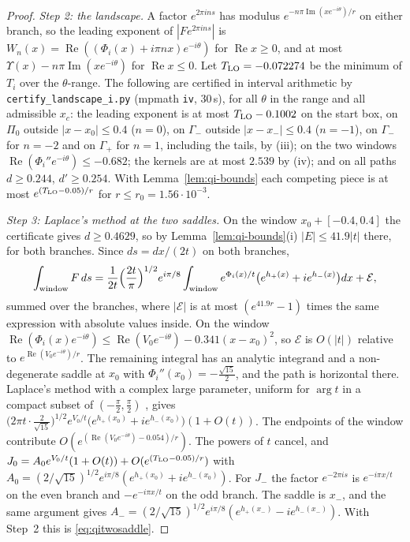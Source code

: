 \documentclass[11pt]{article}
\theoremstyle{plain}
\theoremstyle{definition}
\theoremstyle{remark}
\theoremstyle{plain}\newtheorem*{maintheorem}{Main Theorem}
\begin{document}
\begin{proof}
\emph{Step 2: the landscape.} A factor $e^{2\pi ins}$ has modulus $e^{-n\pi\operatorname{Im}(xe^{-i\theta})/r}$ on
either branch, so the leading exponent of $|Fe^{2\pi ins}|$ is
$W_n(x)=\operatorname{Re}((\Phi_i(x)+i\pi nx)e^{-i\theta})$ for $\operatorname{Re}x\ge0$, and at most
$\Upsilon(x)-n\pi\operatorname{Im}(xe^{-i\theta})$ for $\operatorname{Re}x\le0$. Let $T_{\rm LO}=-0.072274$ be the
minimum of $T_i$ over the $\theta$-range. The following are certified in interval arithmetic by
\texttt{certify\_landscape\_i.py} (mpmath \texttt{iv}, $30$\,s), for all $\theta$ in the range and all
admissible $x_c$: the leading exponent is at most $T_{\rm LO}-0.1002$ on the start box, on $\Pi_0$ outside
$|x-x_0|\le0.4$ ($n=0$), on $\Gamma_-$ outside $|x-x_-|\le0.4$ ($n=-1$), on $\Gamma_-$ for $n=-2$ and on
$\Gamma_+$ for $n=1$, including the tails, by (iii); on the two windows
$\operatorname{Re}(\Phi_i''e^{-i\theta})\le-0.682$; the kernels are at most $2.539$ by (iv); and on all paths
$d\ge0.244$, $d'\ge0.254$. With Lemma~\ref{lem:qi-bounds} each competing piece is at most
$e^{(T_{\rm LO}-0.05)/r}$ for $r\le r_0=1.56\cdot10^{-3}$.

\emph{Step 3: Laplace's method at the two saddles.} On the window $x_0+[-0.4,0.4]$ the certificate gives
$d\ge0.4629$, so by Lemma~\ref{lem:qi-bounds}\textup{(i)} $|E|\le41.9|t|$ there, for both branches. Since
$ds=dx/(2t)$ on both branches,
\[
   \int_{\rm window}F\,ds=\frac1{2t}\Bigl(\frac{2t}\pi\Bigr)^{1/2}e^{i\pi/8}\int_{\rm window}
   e^{\Phi_i(x)/t}\bigl(e^{h_+(x)}+ie^{h_-(x)}\bigr)dx+\mathcal E ,
\]
summed over the branches, where $|\mathcal E|$ is at most $(e^{41.9r}-1)$ times the same expression with
absolute values inside. On the window
$\operatorname{Re}(\Phi_i(x)e^{-i\theta})\le\operatorname{Re}(V_0e^{-i\theta})-0.341(x-x_0)^2$, so $\mathcal E$ is
$O(|t|)$ relative to $e^{\operatorname{Re}(V_0e^{-i\theta})/r}$. The remaining integral has an analytic
integrand and a non-degenerate saddle at $x_0$ with $\Phi_i''(x_0)=-\frac{\sqrt{15}}2$, and the path is
horizontal there. Laplace's method with a complex large parameter, uniform for $\arg t$ in a compact
subset of $(-\frac\pi2,\frac\pi2)$ \cite{Olver1974}, gives
$\bigl(2\pi t\cdot\frac2{\sqrt{15}}\bigr)^{1/2}e^{V_0/t}\bigl(e^{h_+(x_0)}+ie^{h_-(x_0)}\bigr)(1+O(t))$. The
endpoints of the window contribute $O(e^{(\operatorname{Re}(V_0e^{-i\theta})-0.054)/r})$. The powers of $t$
cancel, and $J_0=A_0e^{V_0/t}(1+O(t))+O(e^{(T_{\rm LO}-0.05)/r})$ with
$A_0=(2/\sqrt{15})^{1/2}e^{i\pi/8}(e^{h_+(x_0)}+ie^{h_-(x_0)})$. For $J_-$ the factor $e^{-2\pi is}$ is
$e^{-i\pi x/t}$ on the even branch and $-e^{-i\pi x/t}$ on the odd branch. The saddle is $x_-$, and the same
argument gives $A_-=(2/\sqrt{15})^{1/2}e^{i\pi/8}(e^{h_+(x_-)}-ie^{h_-(x_-)})$. With Step~2 this is
\eqref{eq:qitwosaddle}.


\end{proof}
\end{document}
